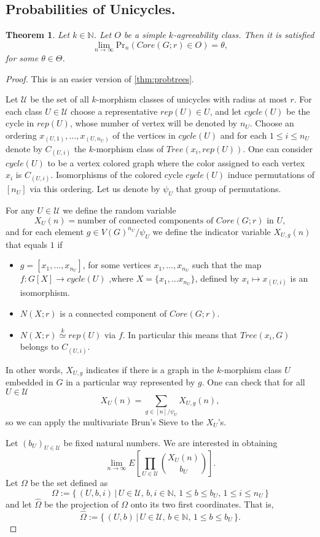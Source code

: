 \documentclass[11pt,notitlepage,a4paper]{article}
\newtheorem{theorem}{Theorem}[section]
\theoremstyle{definition}
\newcommand{\N}{\mathbb{N}}
\newcommand{\Ln}{\lim\limits_{n\to \infty}}
\newcommand{\morph}[1]{\stackrel{#1}{\simeq}}
\begin{document}
\subsection{Probabilities of Unicycles.}

\begin{theorem} \label{thm:probcycles}
	Let $k\in \N$.
	Let $O$ be a simple $k$-agreeability class. Then it is satisfied
	\[ \Ln \mathrm{Pr}_n(Core(G;r)\in O) = \theta, \]
	for some $\theta\in \Theta$.
\end{theorem}

\begin{proof}
	This is an easier version of \cref{thm:probtrees}.\par
	Let $\mathcal{U}$ be the set of all $k$-morphism classes of 
	unicycles with radius at most $r$. 
	For each class $U\in \mathcal{U}$ choose a representative $rep(U)\in U$, 
	and let  $cycle(U)$ be the cycle in $rep(U)$, whose number of vertex will be
	denoted by $n_U$. Choose an ordering $x_{(U,1)},\dots, x_{(U,n_U)}$
	of the vertices in $cycle(U)$ and for each $1\leq i \leq n_{U}$ 
	denote by $C_{(U,i)}$ the $k$-morphism class
	of $Tree(x_i,rep(U))$. One can consider $cycle(U)$ to be a 
	vertex colored graph where the color assigned to each vertex $x_i$
    is $C_{(U,i)}$. Isomorphisms of the colored cycle 
	$cycle(U)$ induce permutations of $[n_U]$ via this ordering. 
	Let us denote by $\psi_U$ that group of permutations.\par 
	For any $U\in \mathcal{U}$ we define the random variable 
	\[X_{U}(n)=\text{number of connected components of }Core(G;r) 
	\text{ in } U ,\]
	and for each element $g\in V(G)^{n_U}/\psi_U$ 
	we define the indicator variable $X_{U,g}(n)$ that equals $1$ if 
	\begin{itemize}
		\item $g=[x_1,\dots, x_{n_U}]$, for some vertices
		$x_1,\dots, x_{n_U}$ such that the map $f:G[X]\rightarrow cycle(U)$ 
		,where $X=\{x_1,\dots x_{n_U}\}$, defined by $x_i\mapsto x_{(U,i)}$ is an
		isomorphism. 
		\item $N(X;r)$ is a connected component of $Core(G;r)$.
		\item $N(X;r)\morph{k} rep(U)$ via $f$. In particular this means
		that $Tree(x_i, G)$ belongs to $C_{(U,i)}$.
	\end{itemize}	
	In other words, $X_{U,g}$ indicates if there is a graph in the $k$-morphism
	class $U$ embedded in $G$ in a particular way represented by $g$.
	One can check that for all $U\in \mathcal{U}$
	\[ X_U(n)=\sum_{g\in [n]/\psi_U} X_{U,g}(n),  \]
	so we can apply the multivariate Brun's Sieve to the $X_U$'s.\par
	Let $(b_U)_{U\in \mathcal{U}}$ be fixed natural numbers. We are interested
	in obtaining
	\[\Ln E\left[\prod_{U\in \mathcal{U}}
	\binom{X_{U}(n)}{b_{U}}\right].\]
	Let $\Omega$ be the set defined as
	\[ \Omega:= \{\, (U,b,i) \, | \, U\in \mathcal{U}, 
	\, b,i\in \N, \, 1\leq b \leq b_U,  \, 1\leq i \leq n_U\,  \}\]
	and let $\widehat{\Omega}$ be the projection of $\Omega$ onto its
	two first coordinates. That is, 
	\[\widehat{\Omega}:=\{\, (U,b) \, | \, U\in \mathcal{U}, 
	\, b\in \N, \, 1\leq b \leq b_U \, \}. \] 


\end{proof}
\end{document}
